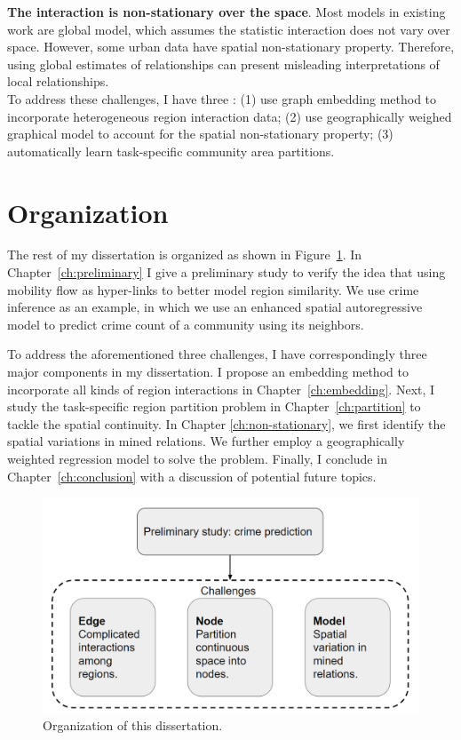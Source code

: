 \textbf{The interaction is non-stationary over the space}. Most models in existing work are global model, which assumes the statistic interaction does not vary over space. However, some urban data have spatial non-stationary property. Therefore, using global estimates of relationships can present misleading interpretations of local relationships. \\


To address these challenges, I have three : (1) use graph embedding method to incorporate heterogeneous region interaction data; (2) use geographically weighed graphical model to account for the spatial non-stationary property; (3) automatically learn task-specific community area partitions.



\section{Organization}


The rest of my dissertation is organized as shown in Figure~\ref{fig:org}. In Chapter~\ref{ch:preliminary} I give a preliminary study to verify the idea that using mobility flow as hyper-links to better model region similarity. We use crime inference as an example, in which we use an enhanced spatial autoregressive model to predict crime count of a community using its neighbors.

To address the aforementioned three challenges, I have correspondingly three major components in my dissertation. I propose an embedding method to incorporate all kinds of region interactions in Chapter~\ref{ch:embedding}. Next, I study the task-specific region partition problem in Chapter~\ref{ch:partition} to tackle the spatial continuity. In Chapter \ref{ch:non-stationary}, we first identify the spatial variations in mined relations. We further employ a geographically weighted regression model to solve the problem. Finally, I conclude in Chapter~\ref{ch:conclusion} with a discussion of potential future topics.


\begin{figure}[h]
\centering
\includegraphics[width=\linewidth]{fig/organization.png}
\caption{Organization of this dissertation.}
\label{fig:org}
\end{figure}


